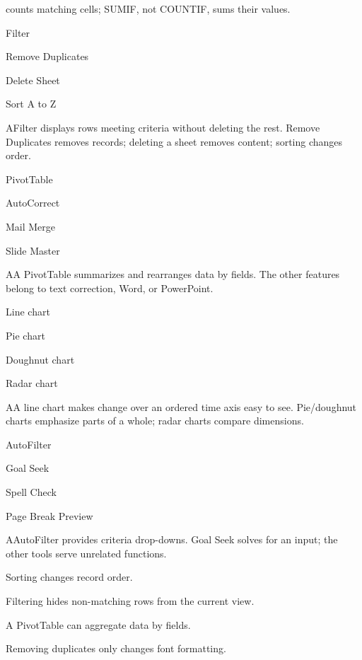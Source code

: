 \begin{enumerate}[label=\textbf{Q\arabic*.}, leftmargin=*]
{  counts matching cells; SUMIF, not COUNTIF, sums their values.}
\fi
\ifnum{}
  {\item Filter
   \item Remove Duplicates
   \item Delete Sheet
   \item Sort A to Z}
  {A}{Filter displays rows meeting criteria without deleting the rest. Remove Duplicates removes records; deleting a sheet removes content; sorting changes order.}
  {\item PivotTable
   \item AutoCorrect
   \item Mail Merge
   \item Slide Master}
  {A}{A PivotTable summarizes and rearranges data by fields. The other features belong to text correction, Word, or PowerPoint.}
  {\item Line chart
   \item Pie chart
   \item Doughnut chart
   \item Radar chart}
  {A}{A line chart makes change over an ordered time axis easy to see. Pie/doughnut charts emphasize parts of a whole; radar charts compare dimensions.}
  {\item AutoFilter
   \item Goal Seek
   \item Spell Check
   \item Page Break Preview}
  {A}{AutoFilter provides criteria drop-downs. Goal Seek solves for an input; the other tools serve unrelated functions.}
  {\item Sorting changes record order.
   \item Filtering hides non-matching rows from the current view.
   \item A PivotTable can aggregate data by fields.
   \item Removing duplicates only changes font formatting.}

\end{enumerate}
